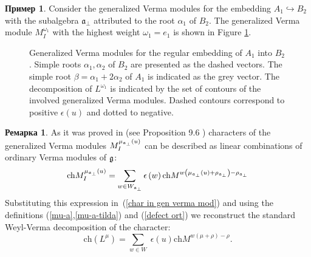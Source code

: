 \documentclass[12pt]{article}
\theoremstyle{definition}
\newtheorem{remark}{Ремарка}
\newtheorem{example}{Пример}
\newcommand{\afb}{\mathfrak{a}_{\bot}}
\begin{document}
\begin{example}
  Consider the generalized Verma modules for the
  embedding  $A_{1}\hookrightarrow B_{2}$ with the subalgebra $\afb$ attributed to the
  root $\alpha_{1}$
  of $B_{2}$. The generalized Verma module $M^{\omega_{1}}_{I}$ with the highest weight
  $\omega_{1}=e_{1}$ is shown in Figure \ref{fig:B2_Verma_Decomp}.
  \begin{figure}[h!bt]
  \noindent{}
  \caption{Generalized Verma modules  for the regular embedding of $A_1$ into $B_2$.
  Simple roots $\alpha_1, \alpha_2$ of $B_2$ are presented as the dashed vectors.
    The simple root $\beta = \alpha_1+2\alpha_2$ of $A_1$ is indicated as the grey vector. The
    decomposition of $L^{\omega_{1}}$ is indicated by
    the set of contours of the involved generalized Verma
  modules. Dashed contours correspond to positive $\epsilon(u)$ and dotted to negative.}

 \label{fig:B2_Verma_Decomp}
\end{figure}

\end{example}

\begin{remark}
As it was proved in \cite{humphreys2008representations} (see Proposition 9.6
) characters of the generalized Verma modules $M_{I}^{\mu _{\frak{a}%
_{\perp }}\left( u\right) }$ can be described as linear combinations of
ordinary Verma modules of $\frak{g}$:
\begin{equation*}
\mathrm{ch}M_{I}^{\mu _{\frak{a}_{\perp }}\left( u\right) }=\sum_{w\in W_{%
\frak{a}_{\perp }}}\epsilon \left( w\right) \mathrm{ch}M^{w\left( \mu _{%
\frak{a}_{\perp }}\left( u\right) +\rho _{\frak{a}_{\perp }}\right) -\rho _{%
\frak{a}_{\perp }}}
\end{equation*}
Substituting this expression in\ (\ref{char in gen verma mod}) and using the
definitions (\ref{mu-a},\ref{mu-a-tilda}) and (\ref{defect ort}) we reconstruct
the standard Weyl-Verma decomposition of the character:
\begin{equation*}
\mathrm{ch}\left( L^{\mu }\right) =\sum_{w\in W}\;\epsilon (u)\mathrm{ch}%
M^{w\left( \mu +\rho \right) -\rho }.
\end{equation*}
\end{remark}
\end{document}
